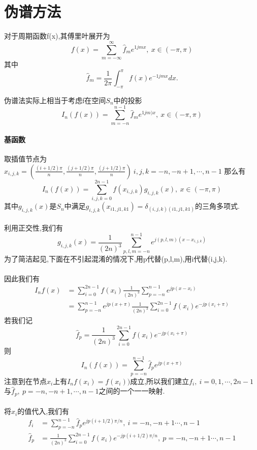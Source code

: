 \documentclass[UTF8]{ctexart}
\begin{document}
\section{伪谱方法}
对于周期函数f(x),其傅里叶展开为
$$
f(x) = \sum\limits _{m=-\infty }^{\infty}\hat{f}_{m}e^{1jmx},\ x\in (-\pi,\pi)
$$
其中
$$
\hat{f}_{m}=\frac{1}{2\pi}\int_{-\pi}^{\pi}f(x)e^{-1jmx}dx.
$$


伪谱法实际上相当于考虑f在空间$S_{n}$中的投影
$$
I_n(f(x)) = \sum\limits_{m=-n}^{n-1}\hat{f}_{m}e^{1jm)x},\ x\in (-\pi,\pi)
$$
\paragraph{基函数}
取插值节点为
$x_{i,j,k}=(\frac{(i+1/2)\pi}{n},\frac{(j+1/2)\pi}{n},\frac{(j+1/2)\pi}{n})\ i,j,k=-n,-n+1,\cdots,n-1$
那么有
$$
I_n(f(x)) = \sum\limits_{i,j,k=0}^{2n-1}f(x_{i,j,k})g_{i,j,k}(x),\ x\in (-\pi,\pi)
$$
其中$g_{i,j,k}(x)$是$S_{n}$中满足$g_{i,j,k}(x_{i1,j1,k1})=\delta_{(i,j,k)(i1,j1,k1)}$的三角多项式.
\paragraph{}
利用正交性,我们有
$$
g_{i,j,k}(x) = \frac{1}{(2n)^3} \sum\limits_{p,l,m=-n}^{n-1}e^{j(p,l,m)(x-x_{i,j,k})}
$$
为了简洁起见,下面在不引起混淆的情况下,用p代替(p,l,m),用i代替(i,j,k).
\paragraph{}
因此我们有
\begin{equation}
 \begin{split}
 I_{n}f(x) &= \sum\limits_{i=0}^{2n-1}f(x_{i})\frac{1}{(2n)^3} \sum\limits_{p=-n}^{n-1}e^{jp(x-x_i)}     \\
   &= \sum\limits_{p=-n}^{n-1}e^{jp(x+\pi)} \frac{1}{(2n)^3} \sum\limits_{i=0}^{2n-1}f(x_{i})e^{-jp(x_i+\pi)}
 \end{split}
\end{equation}
若我们记
$$
\hat{f}_p = \frac{1}{(2n)^3} \sum\limits_{i=0}^{2n-1}f(x_{i})e^{-jp(x_i+\pi)}
$$
则
$$
I_n(f(x)) =  \sum\limits_{p=-n}^{n-1}\hat{f}_p e^{jp(x+\pi)}
$$
注意到在节点$x_{i}$上有$I_nf(x_i)=f(x_i))$成立,所以我们建立$f_i,\ i=0,1,\cdots,2n-1$与$\hat{f}_p,\ p=-n,-n+1,\cdots,n-1$之间的一个一一映射.
\paragraph{}
将$x_i$的值代入,我们有
\begin{equation}
 \begin{split}
 f_i &= \sum\limits_{p=-n}^{n-1}\hat{f}_p e^{jp(i+1/2)\pi/n}   ,\ i=-n,-n+1\cdots,n-1  \\
  \hat{f}_p &= \frac{1}{(2n)^3} \sum\limits_{i=0}^{2n-1}f(x_{i})e^{-jp(i+1/2)\pi/n} ,\ p=-n,-n+1\cdots,n-1
 \end{split}
\end{equation}
\end{document}
